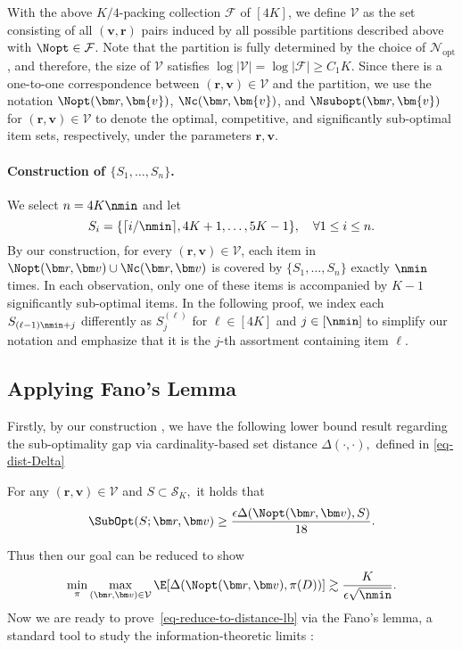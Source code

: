 \documentclass[10pt, letterpaper]{article}
\begin{document}
With the above $K/4$-packing collection $\mathcal{F}$ of $[4K]$, we define $\mathcal{V}$ as the set consisting of all $(\bm{v}, \bm{r})$ pairs induced by all possible partitions described above with $\Nopt \in \mathcal{F}$. Note that the partition is fully determined by the choice of $\mathcal{N}_\text{opt}$, and therefore, the size of $\mathcal{V}$ satisfies $\log\lvert \mathcal{V} \rvert =\log \lvert \mathcal{F} \rvert \geq C_1K$. Since there is a one-to-one correspondence between $(\bm r, \bm{v}) \in \mathcal{V}$ and the partition, we use the notation $\Nopt(\bm r, \bm{v})$, $\Nc(\bm r, \bm{v})$, and $\Nsubopt(\bm r, \bm{v})$ for $(\bm r, \bm{v}) \in \mathcal{V}$ to denote the optimal, competitive, and significantly sub-optimal item sets, respectively, under the parameters $\bm r, \bm{v}$.


\paragraph{Construction of $\{S_1,\dots,S_n\}$.} We select $n = 4K\nmin$ and let $$S_i = \{ \lceil i/\nmin\rceil  , 4K+1,\dots,5K-1 \},\quad \forall 1\leq i \leq n.$$
By our construction, for every $(\bm r, \bm v) \in \mathcal{V}$, each item in $\Nopt(\bm r, \bm v)\cup \Nc(\bm r, \bm v)$ is covered by $\{S_1,\dots,S_n\}$ exactly $\nmin$ times. In each observation, only one of these items is accompanied by $K-1$ significantly sub-optimal items. In the following proof, we  index each $S_{(\ell-1) \nmin + j}$ differently as $S_{j}^{(\ell)}$ for $\ell \in [4K]$ and $j \in [\nmin]$ to simplify our notation and emphasize that it is the $j$-th assortment containing item $\ell$.


\subsection{Applying Fano's Lemma}


Firstly, by our construction , we have the following lower bound result regarding the sub-optimality gap via cardinality-based set distance $\Delta(\cdot,\cdot),$ defined in \eqref{eq-dist-Delta}
\begin{lemma}\label{lem-lb-via-distance} For any $(\bm r, \bm v)\in \mathcal{V}$ and $S\subset \mathcal{S}_K,$ it holds that \begin{align*}
    \SubOpt(S;\bm r, \bm v) \geq  \frac{\epsilon \Delta(\Nopt(\bm r, \bm v) ,S)}{18}.
\end{align*}
\end{lemma}
Thus then our goal can be reduced to show \begin{align}\label{eq-reduce-to-distance-lb}
    \min_{\pi}\max_{(\bm r, \bm v) \in \mathcal{V}} \E[ \Delta (\Nopt(\bm r, \bm v),\pi (D))] \gtrsim \frac{K}{\epsilon\sqrt{\nmin}}.
\end{align}
Now we are ready to prove~\eqref{eq-reduce-to-distance-lb} via the Fano's lemma, a standard tool to study the information-theoretic limits \citep{yu1997assouad,tsybakov2009nonparametric,le2012asymptotic}:
\end{document}
